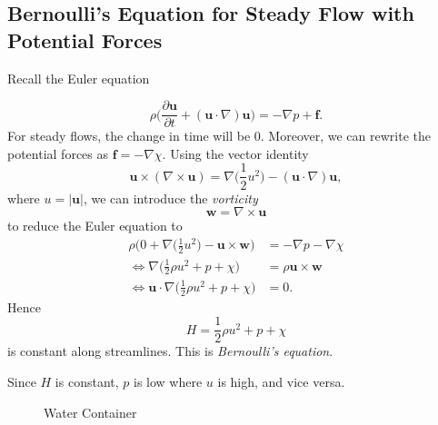 \documentclass[12pt]{article}
\begin{document}
\subsection{Bernoulli's Equation for Steady Flow with Potential Forces}
\label{sub:bernoullis_equation_for_steady_flow_with_potential_forces}

Recall the Euler equation

\[
\rho \biggl( \frac{\partial \mathbf{u}}{\partial t} + (\mathbf{u} \cdot \nabla) \mathbf{u} \biggr) = - \nabla p + \mathbf{f}
.\]
For steady flows, the change in time will be 0. Moreover, we can rewrite the potential forces as $\mathbf{f} = - \nabla \chi$. Using the vector identity
\[
\mathbf{u} \times (\nabla \times \mathbf{u}) = \nabla \biggl( \frac{1}{2} u^2 \biggr) - (\mathbf{u} \cdot \nabla)\mathbf{u}
,\]
where $u = |\mathbf{u}|$, we can introduce the \emph{vorticity}
\[
\mathbf{w} = \nabla \times \mathbf{u}
\]
to reduce the Euler equation to
\begin{align*}
	\rho \biggl( 0 + \nabla \biggl( \frac{1}{2} u^2 \biggr) - \mathbf{u} \times \mathbf{w} \biggr) &= - \nabla p - \nabla \chi \\
	\iff \nabla \biggl( \frac{1}{2} \rho u^2 + p + \chi \biggr) &= \rho \mathbf{u} \times \mathbf{w} \\
	\iff \mathbf{u} \cdot \nabla \biggl( \frac{1}{2} \rho u^2 + p + \chi \biggr) &= 0.
\end{align*}
Hence
\[
H = \frac{1}{2} \rho u^2 + p + \chi
\]
is constant along streamlines. This is \emph{Bernoulli's equation}.

Since $H$ is constant, $p$ is low where $u$ is high, and vice versa.


\begin{figure}[h]
	\centering%
	\caption{Water Container}
	\label{fig:container}
\end{figure}
\end{document}
